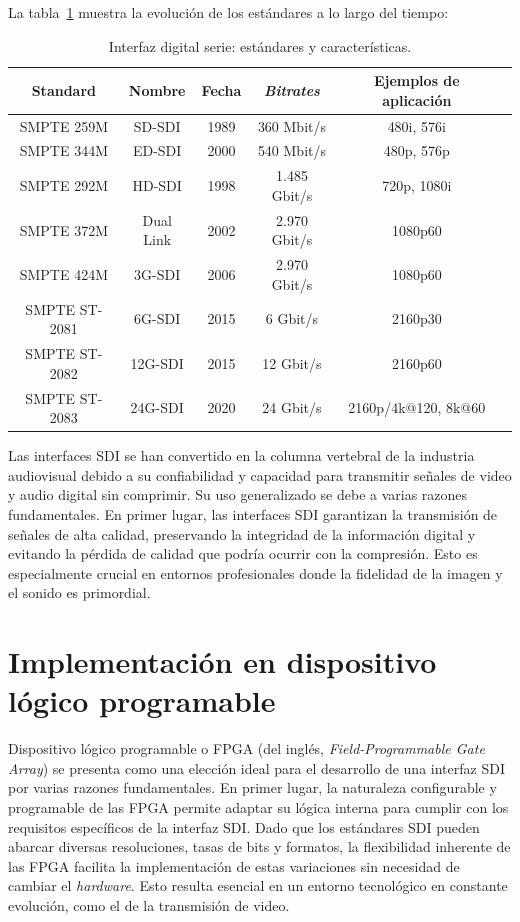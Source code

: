La tabla~\ref{tab:sdi_standards} muestra la evolución de los estándares a lo
largo del tiempo:

\begin{table}[h]
    \caption{Interfaz digital serie: estándares y características.}\label{tab:sdi_standards}
    \centering
    \begin{tabular}{cccccc}
        \toprule
        \textbf{Standard} & \textbf{Nombre} & \textbf{Fecha} & \textbf{\textit{Bitrates}} & \textbf{Ejemplos de aplicación} \\
        \midrule
        SMPTE 259M      & SD-SDI    & 1989 & 360 Mbit/s     & 480i, 576i \\
        SMPTE 344M      & ED-SDI    & 2000 & 540 Mbit/s     & 480p, 576p \\
        SMPTE 292M      & HD-SDI    & 1998 & 1.485 Gbit/s   & 720p, 1080i \\
        SMPTE 372M      & Dual Link & 2002 & 2.970 Gbit/s   & 1080p60 \\
        SMPTE 424M      & 3G-SDI    & 2006 & 2.970 Gbit/s   & 1080p60 \\
        SMPTE ST-2081   & 6G-SDI    & 2015 & 6 Gbit/s       & 2160p30 \\
        SMPTE ST-2082   & 12G-SDI   & 2015 & 12 Gbit/s      & 2160p60 \\
        SMPTE ST-2083   & 24G-SDI   & 2020 & 24 Gbit/s      & 2160p/4k@120, 8k@60 \\
        \bottomrule
    \end{tabular}
\end{table}

Las interfaces SDI se han convertido en la columna vertebral de la industria
audiovisual debido a su confiabilidad y capacidad para transmitir señales de
video y audio digital sin comprimir. Su uso generalizado se debe a varias
razones fundamentales. En primer lugar, las interfaces SDI garantizan la
transmisión de señales de alta calidad, preservando la integridad de la
información digital y evitando la pérdida de calidad que podría ocurrir con la
compresión. Esto es especialmente crucial en entornos profesionales donde la
fidelidad de la imagen y el sonido es primordial.

\section{Implementación en dispositivo lógico programable}

Dispositivo lógico programable o FPGA (del inglés, \textit{Field-Programmable Gate Array}) se presenta como
una elección ideal para el desarrollo de una interfaz SDI por varias razones
fundamentales. En primer lugar, la naturaleza configurable y programable de las
FPGA permite adaptar su lógica interna para cumplir con los requisitos
específicos de la interfaz SDI\@. Dado que los estándares SDI pueden abarcar
diversas resoluciones, tasas de bits y formatos, la flexibilidad inherente de
las FPGA facilita la implementación de estas variaciones sin necesidad de
cambiar el \textit{hardware}. Esto resulta esencial en un entorno tecnológico
en constante evolución, como el de la transmisión de video.

